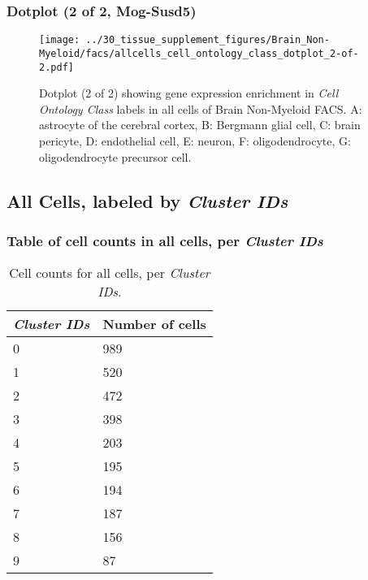 \clearpage

\subsubsection{Dotplot (2 of 2, Mog-Susd5)}
\begin{figure}[h]
\centering
\texttt{[image: ../30\_tissue\_supplement\_figures/Brain\_Non-Myeloid/facs/allcells\_cell\_ontology\_class\_dotplot\_2-of-2.pdf]}

\caption{ Dotplot (2 of 2)  showing gene expression enrichment in \emph{Cell Ontology Class} labels in all cells of Brain Non-Myeloid FACS. A: astrocyte of the cerebral cortex, B: Bergmann glial cell, C: brain pericyte, D: endothelial cell, E: neuron, F: oligodendrocyte, G: oligodendrocyte precursor cell.}
\end{figure}


\clearpage

\subsection{All Cells, labeled by \emph{Cluster IDs}}
\subsubsection{Table of cell counts in all cells, per \emph{Cluster IDs}}\begin{table}[h]
\centering
\label{my-label}
\begin{tabular}{@{}ll@{}}
\toprule

\emph{Cluster IDs}& Number of cells \\ \midrule
0 & 989 \\

1 & 520 \\

2 & 472 \\

3 & 398 \\

4 & 203 \\

5 & 195 \\

6 & 194 \\

7 & 187 \\

8 & 156 \\

9 & 87 \\
\bottomrule
\end{tabular}
\caption{Cell counts for all cells, per \emph{Cluster IDs}.}
\end{table}

